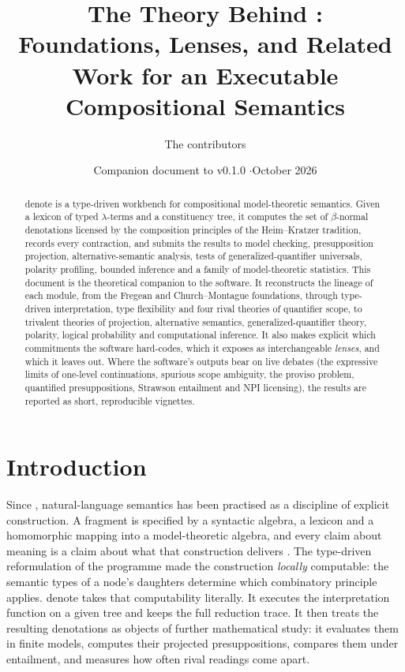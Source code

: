 \documentclass[11pt,a4paper]{article}
\title{The Theory Behind \dn{}:\\[2pt] \large Foundations, Lenses, and Related Work for an Executable Compositional Semantics}
\author{The \dn{} contributors}
\date{Companion document to \dn{} v0.1.0 \quad$\cdot$\quad October 2026}
\newcommand{\dn}{\textsf{denote}}
\theoremstyle{definition}
\begin{document}
\maketitle

\begin{abstract}
\noindent\dn{} is a type-driven workbench for compositional model-theoretic semantics. Given a lexicon of typed $\lambda$-terms and a constituency tree, it computes the set of $\beta$-normal denotations licensed by the composition principles of the Heim--Kratzer tradition, records every contraction, and submits the results to model checking, presupposition projection, alternative-semantic analysis, tests of generalized-quantifier universals, polarity profiling, bounded inference and a family of model-theoretic statistics. This document is the theoretical companion to the software. It reconstructs the lineage of each module, from the Fregean and Church--Montague foundations, through type-driven interpretation, type flexibility and four rival theories of quantifier scope, to trivalent theories of projection, alternative semantics, generalized-quantifier theory, polarity, logical probability and computational inference. It also makes explicit which commitments the software hard-codes, which it exposes as interchangeable \emph{lenses}, and which it leaves out. Where the software's outputs bear on live debates (the expressive limits of one-level continuations, spurious scope ambiguity, the proviso problem, quantified presuppositions, Strawson entailment and NPI licensing), the results are reported as short, reproducible vignettes.
\end{abstract}

\tableofcontents
\bigskip

\section{Introduction}\label{sec:intro}

Since \citet{montague1970efl,montague1970ug,montague1973}, natural-language semantics has been practised as a discipline of explicit construction. A fragment is specified by a syntactic algebra, a lexicon and a homomorphic mapping into a model-theoretic algebra, and every claim about meaning is a claim about what that construction delivers \citep{dowtywallpeters1981,gamut1991,parteehendriks1997,partee2011}. The type-driven reformulation of the programme \citep{kleinsag1985,heimkratzer1998} made the construction \emph{locally} computable: the semantic types of a node's daughters determine which combinatory principle applies. \dn{} takes that computability literally. It executes the interpretation function on a given tree and keeps the full reduction trace. It then treats the resulting denotations as objects of further mathematical study: it evaluates them in finite models, computes their projected presuppositions, compares them under entailment, and measures how often rival readings come apart.
\end{document}
